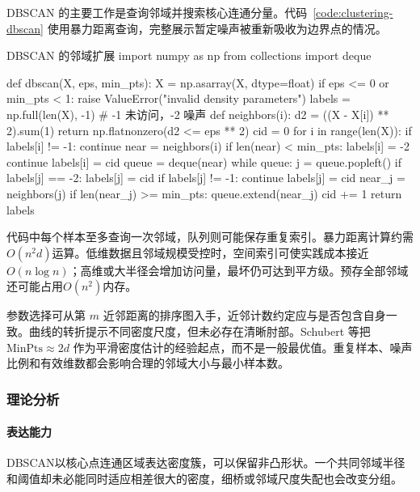 DBSCAN 的主要工作是查询邻域并搜索核心连通分量。代码~\ref{code:clustering-dbscan} 使用暴力距离查询，完整展示暂定噪声被重新吸收为边界点的情况。

\begin{codeblock}[language=Python,label={code:clustering-dbscan}]{DBSCAN 的邻域扩展}
import numpy as np
from collections import deque

def dbscan(X, eps, min_pts):
    X = np.asarray(X, dtype=float)
    if eps <= 0 or min_pts < 1:
        raise ValueError("invalid density parameters")
    labels = np.full(len(X), -1)  # -1 未访问，-2 噪声
    def neighbors(i):
        d2 = ((X - X[i]) ** 2).sum(1)
        return np.flatnonzero(d2 <= eps ** 2)
    cid = 0
    for i in range(len(X)):
        if labels[i] != -1:
            continue
        near = neighbors(i)
        if len(near) < min_pts:
            labels[i] = -2
            continue
        labels[i] = cid
        queue = deque(near)
        while queue:
            j = queue.popleft()
            if labels[j] == -2:
                labels[j] = cid
            if labels[j] != -1:
                continue
            labels[j] = cid
            near_j = neighbors(j)
            if len(near_j) >= min_pts:
                queue.extend(near_j)
        cid += 1
    return labels
\end{codeblock}

代码中每个样本至多查询一次邻域，队列则可能保存重复索引。暴力距离计算约需$O(n^2d)$运算。低维数据且邻域规模受控时，空间索引可使实践成本接近$O(n\log n)$；高维或大半径会增加访问量，最坏仍可达到平方级。预存全部邻域还可能占用$O(n^2)$内存。

参数选择可从第 $m$ 近邻距离的排序图入手，近邻计数约定应与是否包含自身一致。曲线的转折提示不同密度尺度，但未必存在清晰肘部。Schubert 等把 $\mathrm{MinPts}\approx 2d$ 作为平滑密度估计的经验起点，而不是一般最优值。重复样本、噪声比例和有效维数都会影响合理的邻域大小与最小样本数。

\subsubsection{理论分析}

\paragraph{表达能力}
DBSCAN以核心点连通区域表达密度簇，可以保留非凸形状。一个共同邻域半径和阈值却未必能同时适应相差很大的密度，细桥或邻域尺度失配也会改变分组。

